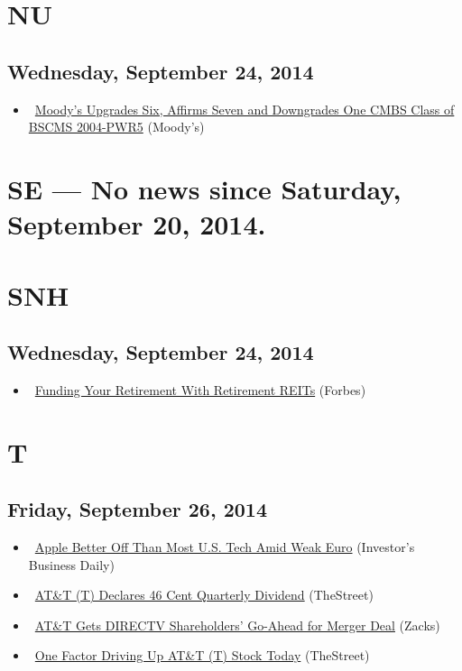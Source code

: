 \documentclass[11pt,asymmetric]{article}
\begin{document}
\section*{NU}

\subsection*{Wednesday, September 24, 2014}
\begin{itemize}
\item\ \href{http://www.moodys.com/page/viewresearchdoc.aspx?docid=PR_309156&WT.mc_id=AM~WWFob29fRmluYW5jZTQyX1NCX1JhdGluZyBOZXdzX0FsbF9Fbmc=~20140924_PR_309156}{Moody's Upgrades Six, Affirms Seven and Downgrades One CMBS Class of BSCMS 2004-PWR5} (Moody's)
\end{itemize}

\section*{SE --- No news since Saturday, September 20, 2014.}


\section*{SNH}

\subsection*{Wednesday, September 24, 2014}
\begin{itemize}
\item\ \href{http://www.forbes.com/sites/moneybuilder/2014/09/24/funding-your-retirement-with-retirement-reits/?partner=yahootix}{Funding Your Retirement With Retirement REITs} (Forbes)
\end{itemize}

\section*{T}

\subsection*{Friday, September 26, 2014}
\begin{itemize}
\item\ \href{http://news.investors.com/092614-719176-apple-can-weather-currency-fluctuation-better-than-other-tech-companies.htm?ven=yahoocp&src=aurlled&ven=yahoo}{Apple Better Off Than Most U.S. Tech Amid Weak Euro} (Investor's Business Daily)
\item\ \href{http://www.thestreet.com/story/12893906/1/att-t-declares-46-cent-quarterly-dividend.html?puc=yahoo&cm_ven=YAHOO}{AT\&T (T) Declares 46 Cent Quarterly Dividend} (TheStreet)
\item\ \href{http://finance.yahoo.com/news/t-gets-directv-shareholders-ahead-181002039.html}{AT\&T Gets DIRECTV Shareholders' Go-Ahead for Merger Deal} (Zacks)
\item\ \href{http://www.thestreet.com/story/12893976/1/one-factor-driving-up-att-t-stock-today.html?puc=yahoo&cm_ven=YAHOO}{One Factor Driving Up AT\&T (T) Stock Today} (TheStreet)
\end{itemize}
\end{document}
